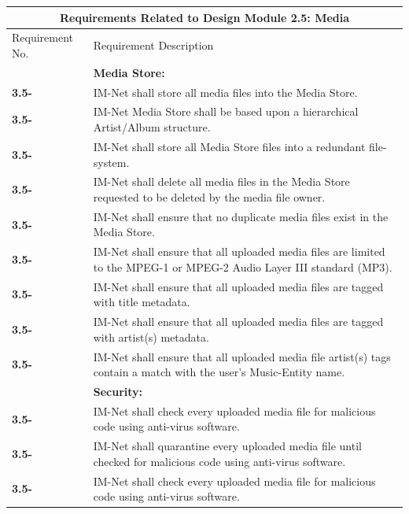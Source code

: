 \documentclass[letterpaper,12pt]{article}
\newcounter{rcounter}							%
\newcommand\rnumber{\stepcounter{rcounter}\arabic{rcounter}}
\begin{document}
{\begin{center}
\begin{tabular}{|l|p{6in}|}
\end{tabular} 
\end{center}

\setcounter{rcounter}{0}
\begin{center}
\begin{tabular}{|l|p{6in}|}
\hline 
\multicolumn{2}{|c|}{\textbf{Requirements Related to Design Module 2.5: Media}} \\ 
\hline 
Requirement No. & Requirement Description \\
\hline
& \textbf{Media Store:} \\
\hline
\textbf{3.5-\rnumber} & IM-Net shall store all media files into the Media Store. \\ 
\hline
\textbf{3.5-\rnumber} & IM-Net Media Store shall be based upon a hierarchical Artist/Album structure. \\ 
\hline
\textbf{3.5-\rnumber} & IM-Net shall store all Media Store files into a redundant file-system. \\ 
\hline
\textbf{3.5-\rnumber} & IM-Net shall delete all media files in the Media Store requested to be deleted by the media file owner. \\ 
\hline
\textbf{3.5-\rnumber} & IM-Net shall ensure that no duplicate media files exist in the Media Store. \\ 
\hline
\textbf{3.5-\rnumber} & IM-Net shall ensure that all uploaded media files are limited to the MPEG-1 or MPEG-2 Audio Layer III standard (MP3). \\ 
\hline
\textbf{3.5-\rnumber} & IM-Net shall ensure that all uploaded media files are tagged with title metadata. \\ 
\hline
\textbf{3.5-\rnumber} & IM-Net shall ensure that all uploaded media files are tagged with artist(s) metadata. \\ 
\hline
\textbf{3.5-\rnumber} & IM-Net shall ensure that all uploaded media file artist(s) tags contain a match with the user's Music-Entity name. \\ 
\hline
& \textbf{Security:} \\
\hline
\textbf{3.5-\rnumber} & IM-Net shall check every uploaded media file for malicious code using anti-virus software. \\ 
\hline
\textbf{3.5-\rnumber} & IM-Net shall quarantine every uploaded media file until checked for malicious code using anti-virus software. \\ 
\hline
\textbf{3.5-\rnumber} & IM-Net shall check every uploaded media file for malicious code using anti-virus software. \\ 

\end{tabular}
\end{center}}
\end{document}
